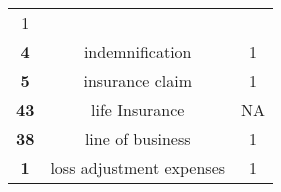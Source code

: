 \documentclass[]{book}
\theoremstyle{definition}
\theoremstyle{definition}
\theoremstyle{definition}
\theoremstyle{remark}
\begin{document}
\begin{longtable}[]{@{}ccc@{}}
\begin{minipage}[t]{0.29\columnwidth}
1\strut
\end{minipage}\tabularnewline
\begin{minipage}[t]{0.11\columnwidth}\centering\strut
\textbf{4}\strut
\end{minipage} & \begin{minipage}[t]{0.42\columnwidth}\centering\strut
indemnification\strut
\end{minipage} & \begin{minipage}[t]{0.29\columnwidth}\centering\strut
1\strut
\end{minipage}\tabularnewline
\begin{minipage}[t]{0.11\columnwidth}\centering\strut
\textbf{5}\strut
\end{minipage} & \begin{minipage}[t]{0.42\columnwidth}\centering\strut
insurance claim\strut
\end{minipage} & \begin{minipage}[t]{0.29\columnwidth}\centering\strut
1\strut
\end{minipage}\tabularnewline
\begin{minipage}[t]{0.11\columnwidth}\centering\strut
\textbf{43}\strut
\end{minipage} & \begin{minipage}[t]{0.42\columnwidth}\centering\strut
life Insurance\strut
\end{minipage} & \begin{minipage}[t]{0.29\columnwidth}\centering\strut
NA\strut
\end{minipage}\tabularnewline
\begin{minipage}[t]{0.11\columnwidth}\centering\strut
\textbf{38}\strut
\end{minipage} & \begin{minipage}[t]{0.42\columnwidth}\centering\strut
line of business\strut
\end{minipage} & \begin{minipage}[t]{0.29\columnwidth}\centering\strut
1\strut
\end{minipage}\tabularnewline
\begin{minipage}[t]{0.11\columnwidth}\centering\strut
\textbf{1}\strut
\end{minipage} & \begin{minipage}[t]{0.42\columnwidth}\centering\strut
loss adjustment expenses\strut
\end{minipage} & \begin{minipage}[t]{0.29\columnwidth}\centering\strut
1\strut
\end{minipage}\tabularnewline

\end{longtable}
\end{document}
